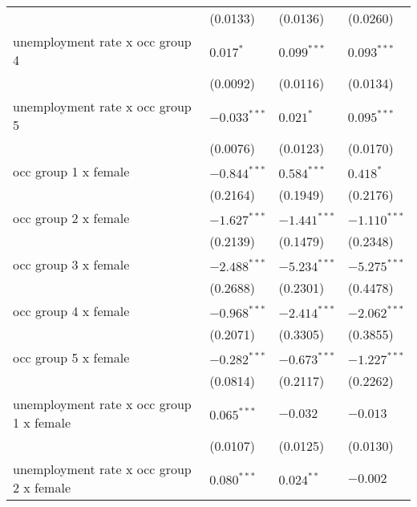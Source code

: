 \begin{tabular}{llll}
                                         &           (0.0133) &           (0.0136) &           (0.0260) \\
unemployment rate x occ group 4          &          $0.017^*$ &      $0.099^{***}$ &      $0.093^{***}$ \\
                                         &           (0.0092) &           (0.0116) &           (0.0134) \\
unemployment rate x occ group 5          &     $-0.033^{***}$ &          $0.021^*$ &      $0.095^{***}$ \\
                                         &           (0.0076) &           (0.0123) &           (0.0170) \\
occ group 1 x female                     &     $-0.844^{***}$ &      $0.584^{***}$ &          $0.418^*$ \\
                                         &           (0.2164) &           (0.1949) &           (0.2176) \\
occ group 2 x female                     &     $-1.627^{***}$ &     $-1.441^{***}$ &     $-1.110^{***}$ \\
                                         &           (0.2139) &           (0.1479) &           (0.2348) \\
occ group 3 x female                     &     $-2.488^{***}$ &     $-5.234^{***}$ &     $-5.275^{***}$ \\
                                         &           (0.2688) &           (0.2301) &           (0.4478) \\
occ group 4 x female                     &     $-0.968^{***}$ &     $-2.414^{***}$ &     $-2.062^{***}$ \\
                                         &           (0.2071) &           (0.3305) &           (0.3855) \\
occ group 5 x female                     &     $-0.282^{***}$ &     $-0.673^{***}$ &     $-1.227^{***}$ \\
                                         &           (0.0814) &           (0.2117) &           (0.2262) \\
unemployment rate x occ group 1 x female &      $0.065^{***}$ &           $-0.032$ &           $-0.013$ \\
                                         &           (0.0107) &           (0.0125) &           (0.0130) \\
unemployment rate x occ group 2 x female &      $0.080^{***}$ &       $0.024^{**}$ &           $-0.002$ \\

\end{tabular}
